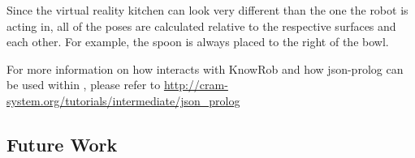 Since the virtual reality kitchen can look very different than the one the robot is acting in, all of the poses are calculated relative to the respective surfaces and each other. For example, the spoon is always placed to the right of the bowl. 

For more information on how \cram interacts with KnowRob and how json-prolog can be used within \cram, please refer to \url{http://cram-system.org/tutorials/intermediate/json_prolog}




\subsection{Future Work}

